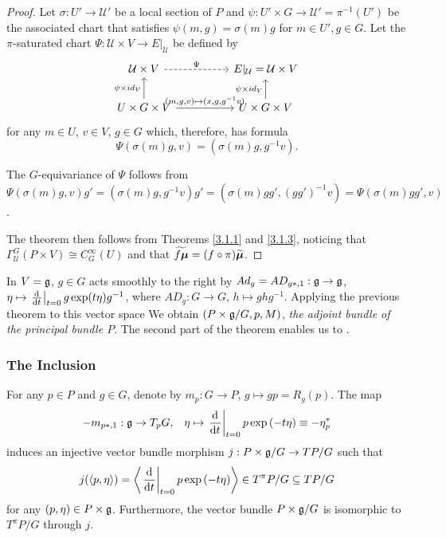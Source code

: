 \begin{proof}
Let $\sigma: U' \to \mathcal U'$ be a local section of $P$ and $\psi: U' \times G \to \mathcal U' = \pi^{-1}(U')$ be the associated chart that satisfies $\psi(m, g) = \sigma(m)g$ for $m \in U', g \in G$. Let the $\pi$-saturated chart $\Psi: \mathcal U \times V \to E|_{\mathcal U}$ be defined by
\begin{equation*}
    \begin{tikzcd}
        \mathcal U \times V \arrow[dashed]{rr}{\Psi} && E|_{\mathcal U} = \mathcal U \times V \\
        U \times G \times V \arrow{u}{\psi \times id_V} \arrow{rr}{(m, g, v) \mapsto (x, g, g^{-1}v)}    && U \times G \times V \arrow{u}{\psi \times id_V}
    \end{tikzcd}
\end{equation*}
for any $m \in U$, $v \in V$, $g \in G$ which, therefore, has formula
\[
    \Psi(\sigma(m)g, v) = (\sigma(m)g, g^{-1}v).
\]

The $G$-equivariance of $\Psi$ follows from $\Psi(\sigma(m)g, v)g' = (\sigma(m)g, g^{-1}v)g' = (\sigma(m)gg', (gg')^{-1}v) = \Psi(\sigma(m)gg', v)$.

The theorem then follows from Theorems \ref{3.1.1} and \ref{3.1.3}, noticing that $\Gamma_{\mathcal U}^G(P \times V) \cong C^\infty_G(U)$ and that $\widetilde{f \bm{\mu}} = (f \circ \pi) \widetilde{\bm{\mu}}$.
\end{proof}

In $V = \mathfrak{g}$, $g \in G$ acts smoothly to the right by $Ad_g = AD_{g*, 1}: \mathfrak{g} \to \mathfrak{g}$, $\eta \mapsto \der{t}[t = 0] g \exp(t \eta) g^{-1}$, where $AD_g: G \to G$, $h \mapsto g h g^{-1}$. Applying the previous theorem to this vector space We obtain $(P \times \mathfrak{g}/G, p, M)$, \emph{the adjoint bundle of the principal bundle $P$}. The second part of the theorem enables us to .

\subsubsection{The Inclusion}

\begin{theorem}
For any $p \in P$ and $g \in G$, denote by $m_p: G \to P$, $g \mapsto gp = R_g(p)$. The map 
    \begin{align}
        -m_{p*, 1}: \alg g \to T_p G,& &\eta \mapsto \der{t}[t = 0]p \exp{(-t \eta)} \equiv -\eta^*_p
    \end{align}
    induces an injective vector bundle morphism $j: P \times \mathfrak{g} / G \to TP/G$ such that 
    \begin{align}\label{formulaJ}
        j(\cl{p, \alg \eta}) = \cl{\der{t}[t = 0] p \exp{(-t \alg \eta)}} \in T^\pi P/G \subset TP/G
    \end{align} for any $(p, \mathfrak{\eta}) \in P \times \mathfrak{g}$. Furthermore, the vector bundle $P \times \mathfrak{g}/G$ is isomorphic to $T^\pi P/G$ through $j$.
\end{theorem}

